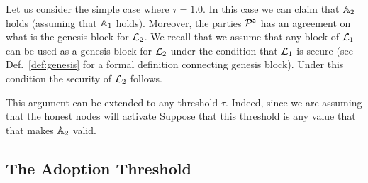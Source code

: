 Let us consider the simple case where $\tau=1.0$. In this case we can claim that $\mathbb{A}_2$ holds (assuming that $\mathbb{A}_1$ holds).
Moreover, the parties $\mathcal{P}^\mathsf{a}$ has an agreement on what is the genesis block for $\mathcal{L}_2$. We recall that we assume that any block of $\mathcal{L}_1$ can be used as
a genesis block for $\mathcal{L}_2$ under the condition that $\mathcal{L}_1$ is secure (see Def.~\ref{def:genesis} for a formal definition connecting genesis block).
Under this condition the security of $\mathcal{L}_2$  follows. 

 
This argument can be extended to any threshold $\tau$. Indeed, since we are assuming that the honest nodes will activate
Suppose that this threshold is any value that that makes $\mathbb{A}_2$ valid.

\subsection{The Adoption Threshold}

